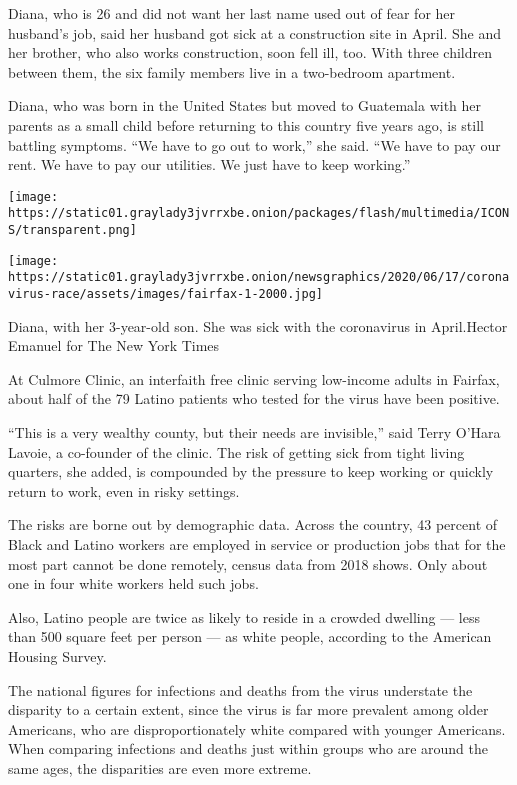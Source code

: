 Diana, who is 26 and did not want her last name used out of fear for her
husband's job, said her husband got sick at a construction site in
April. She and her brother, who also works construction, soon fell ill,
too. With three children between them, the six family members live in a
two-bedroom apartment.

Diana, who was born in the United States but moved to Guatemala with her
parents as a small child before returning to this country five years
ago, is still battling symptoms. ``We have to go out to work,'' she
said. ``We have to pay our rent. We have to pay our utilities. We just
have to keep working.''

\texttt{[image: https://static01.graylady3jvrrxbe.onion/packages/flash/multimedia/ICONS/transparent.png]}

\texttt{[image: https://static01.graylady3jvrrxbe.onion/newsgraphics/2020/06/17/coronavirus-race/assets/images/fairfax-1-2000.jpg]}

Diana, with her 3-year-old son. She was sick with the coronavirus in
April.Hector Emanuel for The New York Times

At Culmore Clinic, an interfaith free clinic serving low-income adults
in Fairfax, about half of the 79 Latino patients who tested for the
virus have been positive.

``This is a very wealthy county, but their needs are invisible,'' said
Terry O'Hara Lavoie, a co-founder of the clinic. The risk of getting
sick from tight living quarters, she added, is compounded by the
pressure to keep working or quickly return to work, even in risky
settings.

The risks are borne out by demographic data. Across the country, 43
percent of Black and Latino workers are employed in service or
production jobs that for the most part cannot be done remotely, census
data from 2018 shows. Only about one in four white workers held such
jobs.

Also, Latino people are twice as likely to reside in a crowded dwelling
--- less than 500 square feet per person --- as white people, according
to the American Housing Survey.

The national figures for infections and deaths from the virus understate
the disparity to a certain extent, since the virus is far more prevalent
among older Americans, who are disproportionately white compared with
younger Americans. When comparing infections and deaths just within
groups who are around the same ages, the disparities are even more
extreme.

